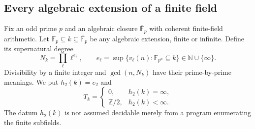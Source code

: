 \subsection{Every algebraic extension of a finite field}

Fix an odd prime $p$ and an algebraic closure $\overline{\mathbb F}_p$
with coherent finite-field arithmetic. Let
$\mathbb F_p\subseteq k\subseteq\overline{\mathbb F}_p$ be any
algebraic extension, finite or infinite. Define its supernatural degree
\[
 N_k=\prod_\ell\ell^{e_\ell},\qquad
 e_\ell=\sup\{v_\ell(n):\mathbb F_{p^n}\subseteq k\}
           \in\mathbb N\cup\{\infty\}.
\]
Divisibility by a finite integer and $\gcd(n,N_k)$ have their
prime-by-prime meanings. We put $h_2(k)=e_2$ and
\[
 T_k=\begin{cases}0,&h_2(k)=\infty,\\
                  \mathbb Z/2,&h_2(k)<\infty.
       \end{cases}                                         \tag{C.3.F1}
\]
The datum $h_2(k)$ is not assumed decidable merely from a program
enumerating the finite subfields.

